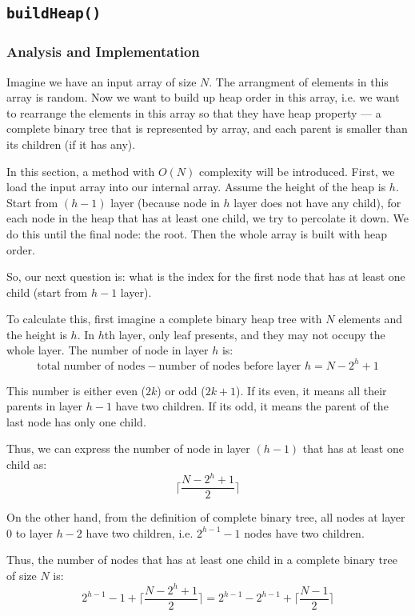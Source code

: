 \documentclass[11pt]{book}
\begin{document}
\subsection{\texttt{buildHeap()}}
\label{sec:org5a8014d}
\subsubsection{Analysis and Implementation}
\label{sec:org2e679c0}
Imagine we have an input array of size \(N\). The arrangment of elements in this array is random. Now we want to build up heap order in this array, i.e. we want to rearrange the elements in this array so that they have heap property --- a complete binary tree that is represented by array, and each parent is smaller than its children (if it has any).

In this section, a method with \(O(N)\) complexity will be introduced. First, we load the input array into our internal array. Assume the height of the heap is \(h\). Start from \((h - 1)\) layer (because node in \(h\) layer does not have any child), for each node in the heap that has at least one child, we try to percolate it down. We do this until the final node: the root. Then the whole array is built with heap order.

So, our next question is: what is the index for the first node that has at least one child (start from \(h - 1\) layer).

To calculate this, first imagine a complete binary heap tree with \(N\) elements and the height is \(h\). In \(h\)th layer, only leaf presents, and they may not occupy the whole layer. The number of node in layer \(h\) is:
\[
\text {total number of nodes} - \text {number of nodes before layer } h = N - 2^h + 1
\]

This number is either even (\(2k\)) or odd (\(2k + 1\)). If its even, it means all their parents in layer \(h - 1\) have two children. If its odd, it means the parent of the last node has only one child.

Thus, we can express the number of node in layer \((h - 1)\) that has at least one child as:
\[
\lceil \frac {N - 2^h + 1} {2} \rceil
\]

On the other hand, from the definition of complete binary tree, all nodes at layer \(0\) to layer \(h - 2\) have two children, i.e. \(2^{h - 1} - 1\) nodes have two children.

Thus, the number of nodes that has at least one child in a complete binary tree of size \(N\) is:
\[
2^{h - 1} - 1 + \lceil \frac {N - 2^h + 1} {2} \rceil
= 2^{h - 1} - 2^{h - 1} + \lceil \frac {N - 1} {2} \rceil
\]
\end{document}
